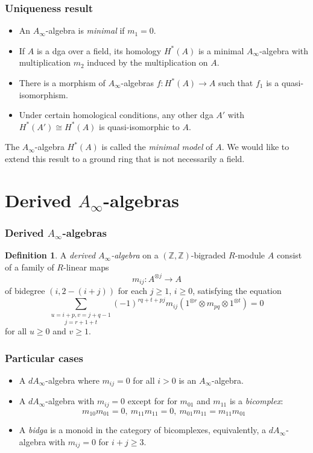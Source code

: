 \documentclass{beamer}
\theoremstyle{definition}
\newtheorem{defi}{Definition}
\newcommand{\Z}{\mathbb{Z}}
\begin{document}
\begin{frame}
\frametitle{Uniqueness result}
\begin{itemize}
\item An $A_\infty$-algebra is \emph{minimal} if $m_1 = 0$. 
\end{itemize}\pause
\begin{theorem}[Kadeishvili]
\begin{itemize}
\item If $A$ is a dga over a field, its homology $H^*(A)$ is a minimal $A_\infty$-algebra with multiplication $m_2$ induced by the multiplication on $A$.
\item There is a morphism of $A_\infty$-algebras $f:H^*(A)\to A$ such that $f_1$ is a quasi-isomorphism.
\item Under certain homological conditions, any other dga $A'$ with $H^*(A')\cong H^*(A)$ is quasi-isomorphic to $A$. 
\end{itemize}
\end{theorem}\pause
The $A_\infty$-algebra $H^*(A)$ is called the \emph{minimal model} of $A$.
We would like to extend this result to a ground ring that is not necessarily a field.
\end{frame}

\section{Derived $A_\infty$-algebras}

\begin{frame}
\frametitle{Derived $A_\infty$-algebras}
\begin{defi}
  A \emph{derived $A_\infty$-algebra} on a $(\Z,\Z)$-bigraded $R$-module $A$ consist of a family of $R$-linear maps 
\[m_{ij}:A^{\otimes j}\to A\]
of bidegree $(i,2-(i+j))$ for each $j\geq 1$, $i\geq 0$, satisfying the equation
\begin{equation}
\underset{j=r+1+t}{\sum_{u=i+p, v=j+q-1}}(-1)^{rq+t+pj}m_{ij}(1^{\otimes r}\otimes m_{pq}\otimes 1^{\otimes t})=0
\end{equation}
for all $u\geq 0$ and $v\geq 1$. 
\end{defi}
\end{frame}

\begin{frame}
\frametitle{Particular cases}
\begin{itemize}
\item<1-> A $dA_\infty$-algebra where $m_{ij}=0$ for all $i>0$ is an $A_\infty$-algebra.
\item<2-> A $dA_\infty$-algebra with $m_{ij}=0$ except for for $m_{01}$ and $m_{11}$ is a \emph{bicomplex}: 
\[m_{10}m_{01}=0,\ m_{11}m_{11}=0,\ m_{01}m_{11}=m_{11}m_{01}\]
\item<3-> A \emph{bidga} is a monoid in the category of bicomplexes, equivalently, a $dA_\infty$-algebra with $m_{ij}=0$ for $i+j\geq 3$.
\end{itemize}
\end{frame}
\end{document}
